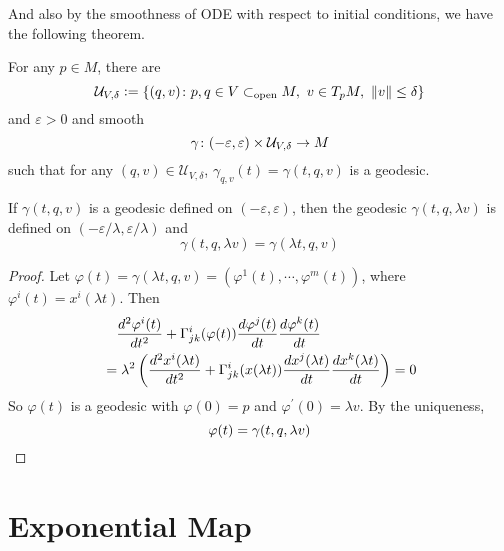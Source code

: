And also by the smoothness of ODE with respect to initial conditions, we have the following theorem.
\begin{thm}
	For any $p \in M$, there are
	\begin{equation*}
		\mathcal{U}_{V,\delta} \vcentcolon= \left\{(q,v) \colon p,q \in V \subset_{\text{open}} M,~v\in T_pM,~\left\lVert v\right\lVert\leq \delta\right\}
	\end{equation*}
	and $\varepsilon > 0$ and smooth
	\begin{equation*}
		\gamma \colon (-\varepsilon,\varepsilon) \times \mathcal{U}_{V,\delta} \rightarrow M
	\end{equation*}
	such that for any $(q,v) \in \mathcal{U}_{V,\delta}$, $\gamma_{q,v}(t) = \gamma(t,q,v)$ is a geodesic.
\end{thm}

\begin{prop}[Homogeneity]
	If $\gamma(t,q,v)$ is a geodesic defined on $(-\varepsilon,\varepsilon)$, then the geodesic $\gamma(t,q,\lambda v)$ is defined on $(-\varepsilon/\lambda, \varepsilon/\lambda)$ and
	\begin{equation*}
		\gamma(t,q,\lambda v) = \gamma(\lambda t,q, v)
	\end{equation*}
\end{prop}
\begin{proof}
	Let $\varphi(t) = \gamma(\lambda t,q, v) = (\varphi^1(t),\cdots,\varphi^m(t))$, where $\varphi^i(t) = x^i(\lambda t)$. Then
	\begin{equation*}
		\begin{aligned}
			&\quad \frac{d^2\varphi^i(t)}{dt^2} + \Gamma^i_{jk}(\varphi(t))\frac{d\varphi^j(t)}{dt}\frac{d\varphi^k(t)}{dt} \\
			&= \lambda^2\left(\frac{d^2x^i(\lambda t)}{dt^2} + \Gamma^i_{jk}(x(\lambda t))\frac{dx^j(\lambda t)}{dt}\frac{dx^k(\lambda t)}{dt}\right) = 0
		\end{aligned}
	\end{equation*}
	So $\varphi(t)$ is a geodesic with $\varphi(0) = p$ and $\varphi^\prime(0) = \lambda v$. By the uniqueness,
	\begin{equation*}
		\varphi(t) = \gamma(t,q,\lambda v) \qedhere
	\end{equation*}
\end{proof}

\section{Exponential Map}

